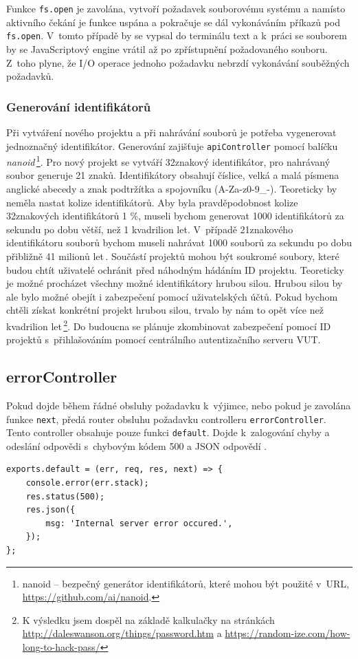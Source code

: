 Funkce \texttt{fs.open} je zavolána, vytvoří požadavek souborovému systému a namísto aktivního čekání je funkce uspána a pokračuje se dál vykonáváním příkazů pod \texttt{fs.open}. V~tomto případě by se vypsal do terminálu text  a k~práci se souborem by se JavaScriptový engine vrátil až po zpřístupnění požadovaného souboru. Z~toho plyne, že I/O operace jednoho požadavku nebrzdí vykonávání souběžných požadavků.

\subsubsection{Generování identifikátorů}
Při vytváření nového projektu a při nahrávání souborů je potřeba vygenerovat jednoznačný identifikátor. Generování zajišťuje \texttt{apiController} pomocí balíčku \textit{nanoid}\,\footnote{nanoid -- bezpečný generátor identifikátorů, které mohou být použité v~URL, \url{https://github.com/ai/nanoid}.}. Pro nový projekt se vytváří 32znakový identifikátor, pro nahrávaný soubor generuje 21 znaků. Identifikátory obsahují číslice, velká a malá písmena anglické abecedy a znak podtržítka a spojovníku (A-Za-z0-9\_-). Teoreticky by neměla nastat kolize identifikátorů. Aby byla pravděpodobnost kolize 32znakových identifikátorů 1 \%, museli bychom generovat 1000 identifikátorů za sekundu po dobu větší, než 1 kvadrilion let. V~případě 21znakového identifikátoru souborů bychom museli nahrávat 1000 souborů za sekundu po dobu přibližně 41 milionů let\,\cite{collision}. Součástí projektů mohou být soukromé soubory, které budou chtít uživatelé ochránit před náhodným hádáním ID projektu. Teoreticky je možné procházet všechny možné identifikátory hrubou silou. Hrubou silou by ale bylo možné obejít i zabezpečení pomocí uživatelských účtů. Pokud bychom chtěli získat konkrétní projekt hrubou silou, trvalo by nám to opět více než kvadrilion let\,\footnote{K výsledku jsem dospěl na základě kalkulačky na stránkách \url{http://daleswanson.org/things/password.htm} a \url{https://random-ize.com/how-long-to-hack-pass/}}. Do budoucna se plánuje zkombinovat zabezpečení pomocí ID projektů s~přihlašováním pomocí centrálního autentizačního serveru VUT. 

\subsection{errorController}
Pokud dojde během řádné obsluhy požadavku k~výjimce, nebo pokud je zavolána funkce \texttt{next}, předá router obsluhu požadavku controlleru \texttt{errorController}. Tento controller obsahuje pouze funkci \texttt{default}. Dojde k~zalogování chyby a odeslání odpovědi s~chybovým kódem 500 a JSON odpovědí .
\begin{lstlisting}[style=JavaScript]
exports.default = (err, req, res, next) => {
    console.error(err.stack);
    res.status(500);
    res.json({
        msg: 'Internal server error occured.',
    });
};
\end{lstlisting}

